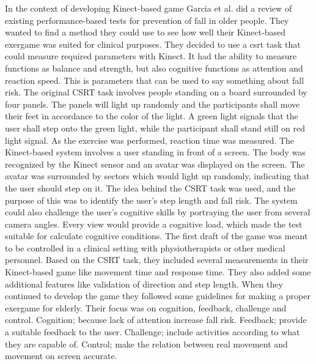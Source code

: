 In the context of developing Kinect-based game Garcia et al. did a review of existing performance-based tests for prevention of fall in older people. They wanted to find a method they could use to see how well their Kinect-based exergame was suited for clinical purposes. They decided to use a \ac{csrt} task that could measure required parameters with Kinect.  It had the ability to measure functions as balance and strength, but also cognitive functions as attention and reaction speed. This is parameters that can be used to say something about fall risk. The original CSRT task involves people standing on a board surrounded by four panels. The panels will light up randomly and the participants shall move their feet in accordance to the color of the light. A green light signals that the user shall step onto the green light, while the participant shall stand still on red light signal. As the exercise was performed, reaction time was measured. The Kinect-based system involves a user standing in front of a screen. The body was recognized by the Kinect sensor and an avatar was displayed on the screen.  The avatar was surrounded by sectors which would light up randomly, indicating that the user should step on it. The idea behind the CSRT task was used, and the purpose of this was to identify the user’s step length and fall risk. The system could also challenge the user’s cognitive skills by portraying the user from several camera angles. Every view would provide a cognitive load, which made the test suitable for calculate cognitive conditions.  The first draft of the game was meant to be controlled in a clinical setting with physiotherapists or other medical personnel. Based on the CSRT task, they included several measurements in their Kinect-based game like movement time and response time. They also added some additional features like validation of direction and step length. When they continued to develop the game they followed some guidelines for making a proper exergame for elderly. Their focus was on cognition, feedback, challenge and control. Cognition; because lack of attention increase fall risk. Feedback; provide a suitable feedback to the user. Challenge; include activities according to what they are capable of. Control; make the relation between real movement and movement on screen accurate. \cite{garcia2012exergames} \\ \\
